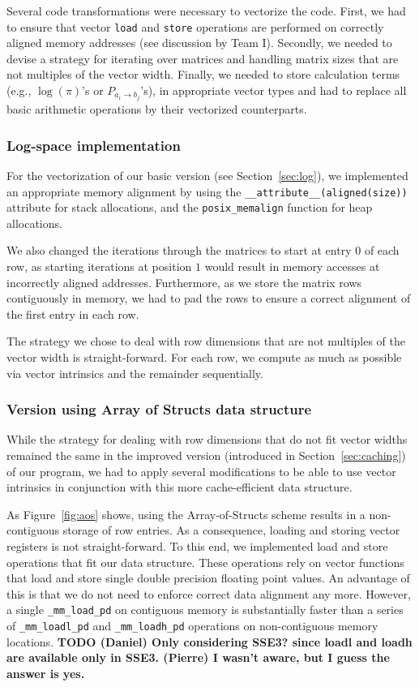\documentclass[runningheads,a4paper]{llncs}
\begin{document}
Several code transformations were necessary to vectorize the code. 
First, we had to ensure that vector \texttt{load} and \texttt{store} operations are performed on correctly aligned memory addresses (see discussion by Team I). 
Secondly, we needed to devise a strategy for iterating over matrices and handling matrix sizes that are not multiples of the vector width.
Finally, we needed to store calculation terms (e.g., $\log(\pi)$'s or $P_{a_i \to b_j}$'s), in appropriate vector types and 
had to replace all basic arithmetic operations by their vectorized counterparts.

\subsubsection{Log-space implementation}
For the vectorization of our basic version (see Section~\ref{sec:log}), we implemented an appropriate memory alignment 
by using the \texttt{\_\_attribute\_\_(aligned(\texttt{size}))} attribute for stack allocations, 
and the \texttt{posix\_memalign} function for heap allocations.

We also changed the iterations through the matrices to start at entry $0$ of each row, as starting iterations at position $1$ 
would result in memory accesses at incorrectly aligned addresses. 
Furthermore, as we store the matrix rows contiguously in memory, 
we had to pad the rows to ensure a correct alignment of the first entry in each row.

The strategy we chose to deal with row dimensions that are not multiples of the vector width is straight-forward. 
For each row, we compute as much as possible via vector intrinsics and the remainder sequentially. 

\subsubsection{Version using Array of Structs data structure}
While the strategy for dealing with row dimensions that do not fit vector widths remained the same in the improved version (introduced in Section~\ref{sec:caching}) of our program, 
we had to apply several modifications to be able to use vector intrinsics in conjunction with this more cache-efficient data structure.

As Figure~\ref{fig:aos} shows, using the Array-of-Structs scheme results in a non-contiguous storage of row entries. 
As a consequence, loading and storing vector registers is not straight-forward. 
To this end, we implemented load and store operations that fit our data structure. 
These operations rely on vector functions that load and store single double precision floating point values. 
An advantage of this is that we do not need to enforce correct data alignment any more. 
However, a single  \texttt{\_mm\_load\_pd} on contiguous memory is substantially faster than a series of \texttt{\_mm\_loadl\_pd} and \texttt{\_mm\_loadh\_pd} operations
on non-contiguous memory locations. {\bf TODO (Daniel) Only considering SSE3? since loadl and loadh are available only in SSE3. (Pierre) I wasn't aware, but I guess the answer is yes.}
\end{document}
